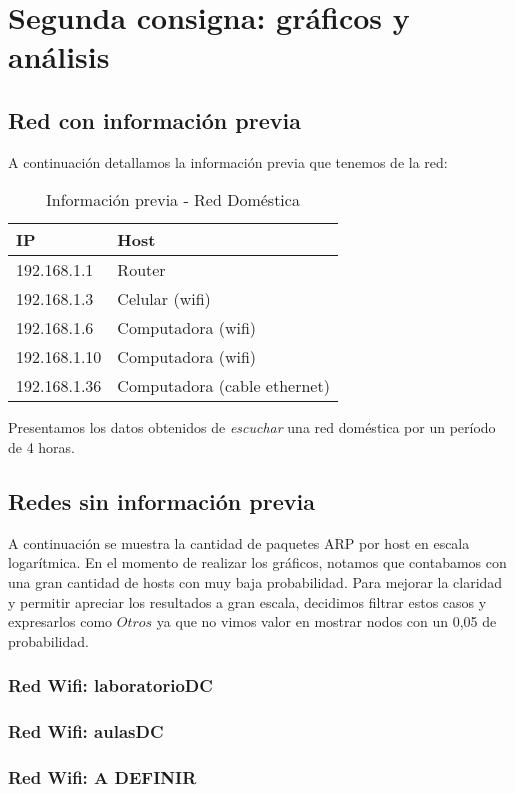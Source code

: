 \section{Segunda consigna: gráficos y análisis}

\subsection{Red con información previa}
A continuación detallamos la información previa que tenemos de la red:\\
\begin{table}[htb]
\begin{center}
\begin{tabular}{|l|l|}
\hline
IP & Host \\
\hline \hline
192.168.1.1 & Router \\ \hline
192.168.1.3 & Celular (wifi) \\ \hline
192.168.1.6 & Computadora (wifi)  \\ \hline
192.168.1.10 & Computadora (wifi) \\ \hline
192.168.1.36 & Computadora (cable ethernet) \\ \hline
\end{tabular}
\caption{Información previa - Red Doméstica}
\label{tabla informacion}
\end{center}
\end{table}


Presentamos los datos obtenidos de \emph{escuchar} una red doméstica por un período de 4 horas.\\


\subsection{Redes sin información previa}
A continuación se muestra la cantidad de paquetes ARP por host en escala logarítmica. 
En el momento de realizar los gráficos, notamos que contabamos con una gran cantidad de hosts con muy baja probabilidad. 
Para mejorar la claridad y permitir apreciar los resultados a gran escala, decidimos filtrar estos casos y expresarlos como $Otros$ ya que 
no vimos valor en mostrar nodos con un 0,05 de probabilidad.\\

\subsubsection{Red Wifi: laboratorioDC}


\newpage
\subsubsection{Red Wifi: aulasDC}


\newpage
\subsubsection{Red Wifi: A DEFINIR}